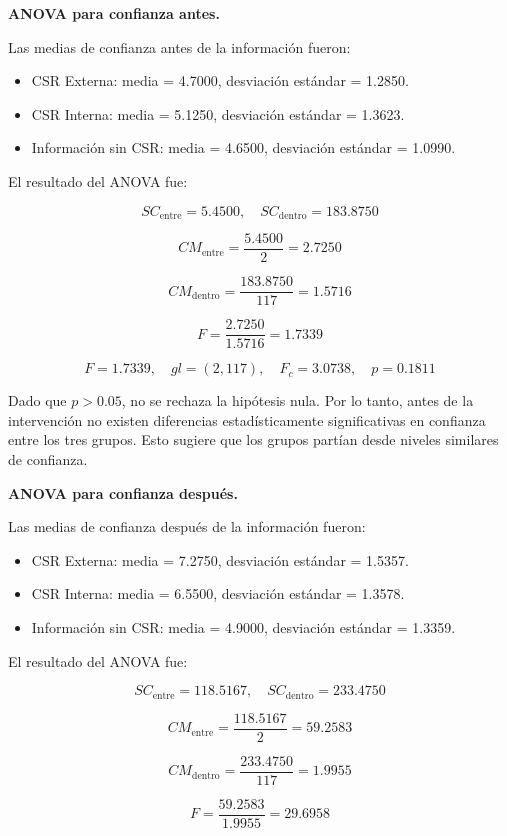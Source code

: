 \documentclass[12pt,letterpaper]{article}
\begin{document}
\textbf{ANOVA para confianza antes.}

Las medias de confianza antes de la información fueron:

\begin{itemize}
    \item CSR Externa: media = 4.7000, desviación estándar = 1.2850.
    \item CSR Interna: media = 5.1250, desviación estándar = 1.3623.
    \item Información sin CSR: media = 4.6500, desviación estándar = 1.0990.
\end{itemize}

El resultado del ANOVA fue:

\[
SC_{\text{entre}} = 5.4500,\quad
SC_{\text{dentro}} = 183.8750
\]

\[
CM_{\text{entre}} =
\frac{5.4500}{2}
= 2.7250
\]

\[
CM_{\text{dentro}} =
\frac{183.8750}{117}
= 1.5716
\]

\[
F =
\frac{2.7250}{1.5716}
= 1.7339
\]

\[
F = 1.7339,\quad gl = (2,117),\quad F_c = 3.0738,\quad p = 0.1811
\]

Dado que \(p > 0.05\), no se rechaza la hipótesis nula. Por lo tanto, antes de la intervención no existen diferencias estadísticamente significativas en confianza entre los tres grupos. Esto sugiere que los grupos partían desde niveles similares de confianza.

\textbf{ANOVA para confianza después.}

Las medias de confianza después de la información fueron:

\begin{itemize}
    \item CSR Externa: media = 7.2750, desviación estándar = 1.5357.
    \item CSR Interna: media = 6.5500, desviación estándar = 1.3578.
    \item Información sin CSR: media = 4.9000, desviación estándar = 1.3359.
\end{itemize}

El resultado del ANOVA fue:

\[
SC_{\text{entre}} = 118.5167,\quad
SC_{\text{dentro}} = 233.4750
\]

\[
CM_{\text{entre}} =
\frac{118.5167}{2}
= 59.2583
\]

\[
CM_{\text{dentro}} =
\frac{233.4750}{117}
= 1.9955
\]

\[
F =
\frac{59.2583}{1.9955}
= 29.6958
\]
\end{document}
